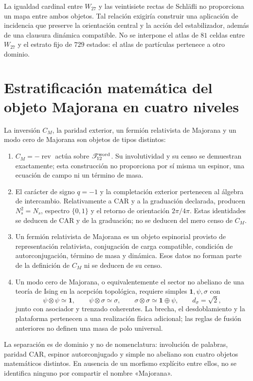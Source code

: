 La igualdad cardinal entre \(W_{27}\) y las veintisiete rectas de Schläfli
no proporciona un mapa entre ambos objetos. Tal relación exigiría construir
una aplicación de incidencia que preserve la orientación central y la acción
del estabilizador, además de una clausura dinámica compatible. No se
interpone el atlas de \(81\) celdas entre \(W_{27}\) y el estrato fijo de
\(729\) estados: el atlas de partículas pertenece a otro dominio.

\section[Niveles de Majorana]{Estratificación matemática del objeto Majorana en cuatro niveles}
\label{sec:cuatro-niveles-majorana}

La inversión \(C_M\), la paridad exterior, un fermión relativista de
Majorana y un modo cero de Majorana son objetos de tipos distintos:

\begin{enumerate}
 \item \(C_M=-\operatorname{rev}\) actúa sobre
 \(\mathscr T_{12}^{\rm word}\). Su involutividad y su censo se demuestran
 exactamente; esta construcción no proporciona por sí misma un espinor, una
 ecuación de campo ni un término de masa.

 \item El carácter de signo \(q=-1\) y la completación exterior pertenecen
 al álgebra de intercambio. Relativamente a CAR y a la graduación declarada,
 producen \(N_s^2=N_s\), espectro \(\{0,1\}\) y el retorno de orientación
 \(2\pi/4\pi\). Estas identidades se deducen de CAR y de la graduación; no se
 deducen del
 mero censo de \(C_M\).

 \item Un fermión relativista de Majorana es un objeto espinorial provisto de
 representación relativista, conjugación de carga compatible, condición de
 autorconjugación, término de masa y dinámica. Esos datos no forman parte de
 la definición de \(C_M\) ni se deducen de su censo.

 \item Un modo cero de Majorana, o equivalentemente el sector no abeliano de
 una teoría de Ising en la acepción topológica, requiere simples
 \(\mathbf 1,\psi,\sigma\) con
 \[
  \psi\otimes\psi\simeq\mathbf 1,\qquad
  \psi\otimes\sigma\simeq\sigma,\qquad
  \sigma\otimes\sigma\simeq\mathbf 1\oplus\psi,\qquad
  d_\sigma=\sqrt2,
 \]
 junto con asociador y trenzado coherentes. La brecha, el desdoblamiento y la
 plataforma pertenecen a una realización física adicional; las reglas de
 fusión anteriores no definen una masa de polo universal.
\end{enumerate}

La separación es de dominio y no de nomenclatura: involución de palabras,
paridad CAR, espinor autorconjugado y simple no abeliano son cuatro objetos
matemáticos distintos. En ausencia de un morfismo explícito entre ellos, no
se identifica ninguno por compartir el nombre «Majorana».
